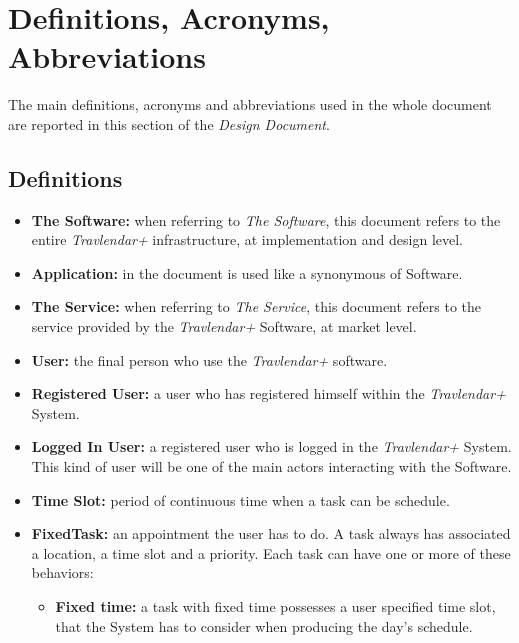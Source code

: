 \section{Definitions, Acronyms, Abbreviations}
The main definitions, acronyms and abbreviations used in the whole document are reported in this section of the \emph{Design Document}.

\subsection{Definitions}
\begin{itemize}
    \item   \textbf{The Software:} when referring to \emph{The Software}, this document refers to the entire                  \emph{Travlendar+} infrastructure, at implementation and design level.
        
    \item   \textbf{Application:} in the document is used like a synonymous of Software.
  
    \item   \textbf{The Service:}  when referring to \emph{The Service}, this document refers to the service provided         by the \emph{Travlendar+} Software, at market level.
    
    \item \textbf{User:} the final person who use the \emph{Travlendar+} software.
    
    \item \textbf{Registered User:} a user who has registered himself within the \emph{Travlendar+} System.
    
    \item \textbf{Logged In User:} a registered user who is logged in the \emph{Travlendar+} System. This kind of user will be one of the main actors interacting with the Software.
    
    \item \textbf{Time Slot:} period of continuous time when a task can be schedule.
    
    \item \textbf{FixedTask:} an appointment the user has to do. A task always has associated a location, a time slot and a priority. Each task can have one or more of these behaviors:
    \begin{itemize}
        \item \textbf{Fixed time:} a task with fixed time possesses a user specified time slot, that the System has to consider when producing the day's schedule.


\end{itemize}
\end{itemize}

